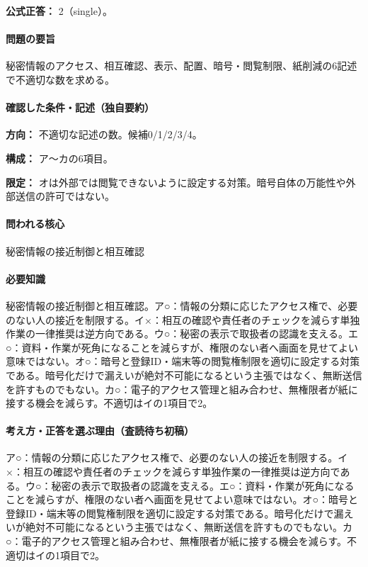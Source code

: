 \textbf{公式正答：} 2（single）。

\paragraph{問題の要旨} 秘密情報のアクセス、相互確認、表示、配置、暗号・閲覧制限、紙削減の6記述で不適切な数を求める。

\paragraph{確認した条件・記述（独自要約）}\mbox{}\par

\noindent\textbf{方向：} 不適切な記述の数。候補0/1/2/3/4。\par

\noindent\textbf{構成：} ア〜カの6項目。\par

\noindent\textbf{限定：} オは外部では閲覧できないように設定する対策。暗号自体の万能性や外部送信の許可ではない。\par

\paragraph{問われる核心} 秘密情報の接近制御と相互確認

\paragraph{必要知識} 秘密情報の接近制御と相互確認。ア○：情報の分類に応じたアクセス権で、必要のない人の接近を制限する。イ×：相互の確認や責任者のチェックを減らす単独作業の一律推奨は逆方向である。ウ○：秘密の表示で取扱者の認識を支える。エ○：資料・作業が死角になることを減らすが、権限のない者へ画面を見せてよい意味ではない。オ○：暗号と登録ID・端末等の閲覧権制限を適切に設定する対策である。暗号化だけで漏えいが絶対不可能になるという主張ではなく、無断送信を許すものでもない。カ○：電子的アクセス管理と組み合わせ、無権限者が紙に接する機会を減らす。不適切はイの1項目で2。

\paragraph{考え方・正答を選ぶ理由（査読待ち初稿）} ア○：情報の分類に応じたアクセス権で、必要のない人の接近を制限する。イ×：相互の確認や責任者のチェックを減らす単独作業の一律推奨は逆方向である。ウ○：秘密の表示で取扱者の認識を支える。エ○：資料・作業が死角になることを減らすが、権限のない者へ画面を見せてよい意味ではない。オ○：暗号と登録ID・端末等の閲覧権制限を適切に設定する対策である。暗号化だけで漏えいが絶対不可能になるという主張ではなく、無断送信を許すものでもない。カ○：電子的アクセス管理と組み合わせ、無権限者が紙に接する機会を減らす。不適切はイの1項目で2。

